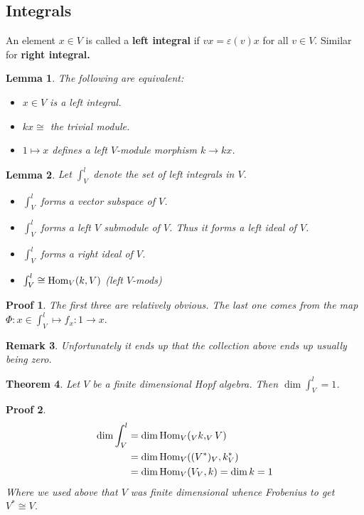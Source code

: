 \documentclass[12pt]{article}
\theoremstyle{break}
\theoremstyle{nonumberbreak}
\theoremstyle{changebreak}
\newtheorem{thm}{Theorem}[subsection]
\newtheorem{lem}[thm]{Lemma}
\theoremstyle{break}
\theoremstyle{nonumberbreak}
\newtheorem{prf}{Proof}
\theoremstyle{nonumberplain}
\theoremstyle{change}
\newtheorem{rmk}[thm]{Remark}
\newcommand*{\Hom}{\ensuremath\text{Hom}}
\begin{document}
\subsection{Integrals}
\begin{defn}
	An element $x\in V$ is called a \textbf{left integral} if $vx=\varepsilon(v)x$ for all $v\in V$.
	Similar for \textbf{right integral.}
\end{defn}
\begin{lem}
	The following are equivalent:
	\begin{itemize}
		\item $x\in V$ is a left integral.
		\item $kx\cong$ the trivial module.
		\item $1\mapsto x$ defines a left $V$-module morphism $k\to kx$.
	\end{itemize}
\end{lem}
\begin{lem}
	Let $\int_V^l$ denote the set of left integrals in $V$.
	\begin{itemize}
		\item $\int_V^l$ forms a vector subspace of $V$.
		\item $\int_V^l$ forms a left $V$ submodule of $V$. Thus it forms a left ideal of $V$.
		\item $\int_V^l$ forms a right ideal of $V$.
		\item $\int_V^l\cong\Hom_V(k,V)$ (left $V$-mods)
	\end{itemize}
\end{lem}
\begin{prf}
	The first three are relatively obvious. The last one comes from the map $\Phi:x\in\int_V^l\mapsto f_x:1\to x.$
\end{prf}
\begin{rmk}
	Unfortunately it ends up that the collection above ends up usually being zero. 
\end{rmk}
\begin{thm}
	Let $V$ be a finite dimensional Hopf algebra. Then $\dim\int_V^l=1$.
\end{thm}
\begin{prf}
	\begin{align*}
		\dim\int_V^l&= \dim\Hom_V(_Vk,_VV)\\
		&=\dim\Hom_V((V^*)_V,k_V^*)\\
		&=\dim\Hom_V(V_V,k)=\dim k=1
	\end{align*}
	Where we used above that $V$ was finite dimensional whence Frobenius to get $V^*\cong V$.
\end{prf}
\end{document}
